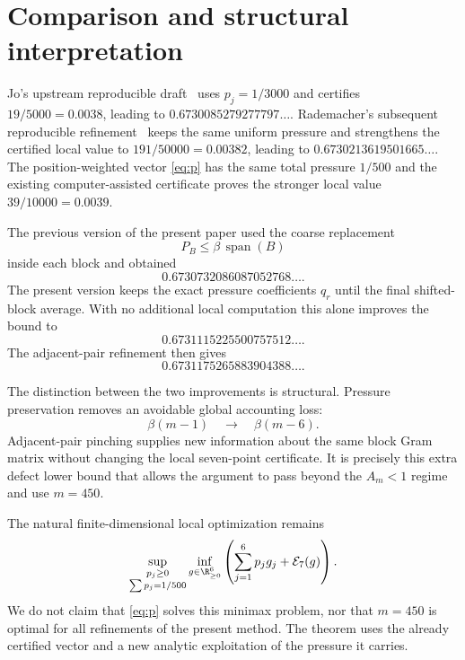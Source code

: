 \section{Comparison and structural interpretation}

Jo's upstream reproducible draft~\cite{Jo26} uses
\(p_j=1/3000\) and certifies \(19/5000=0.0038\), leading to
\(0.6730085279277797\ldots\).  Rademacher's subsequent reproducible
refinement~\cite{Rademacher26} keeps the same uniform pressure and strengthens
the certified local value to \(191/50000=0.00382\), leading to
\(0.6730213619501665\ldots\).  The position-weighted vector \eqref{eq:p}
has the same total pressure \(1/500\) and the existing computer-assisted
certificate proves the stronger local value \(39/10000=0.0039\).

The previous version of the present paper used the coarse replacement
\[
 P_B\le\beta\,\operatorname{span}(B)
\]
inside each block and obtained
\[
 0.6730732086087052768\ldots .
\]
The present version keeps the exact pressure coefficients \(q_r\) until the
final shifted-block average.  With no additional local computation this alone
improves the bound to
\[
 0.6731115225500757512\ldots .
\]
The adjacent-pair refinement then gives
\[
 \boxed{0.6731175265883904388\ldots}.
\]

The distinction between the two improvements is structural.  Pressure
preservation removes an avoidable global accounting loss:
\[
 \beta(m-1)\quad\longrightarrow\quad\beta(m-6).
\]
Adjacent-pair pinching supplies new information about the same block Gram
matrix without changing the local seven-point certificate.  It is precisely
this extra defect lower bound that allows the argument to pass beyond the
\(A_m<1\) regime and use \(m=450\).

The natural finite-dimensional local optimization remains
\begin{equation}\label{eq:minimax}
 \sup_{\substack{p_j\ge0\\\sum p_j=1/500}}
 \inf_{g\in\R_{\ge0}^6}
 \left(\sum_{j=1}^6p_jg_j+\mathcal E_7(g)\right).
\end{equation}
We do not claim that \eqref{eq:p} solves this minimax problem, nor that
\(m=450\) is optimal for all refinements of the present method.  The theorem
uses the already certified vector and a new analytic exploitation of the
pressure it carries.
